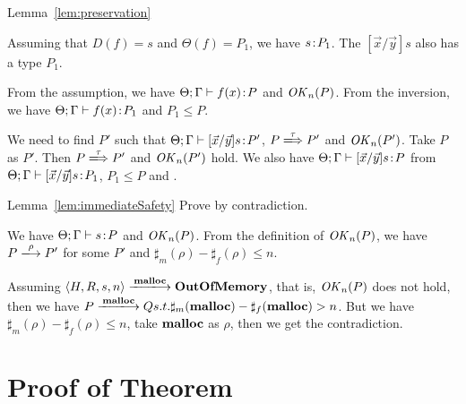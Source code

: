 \begin{pfof}{Lemma~\ref{lem:preservation}}
\begin{itemize}
  Assuming that \(D(f) = s\) and \(\Theta(f) = P_1\), we have \(s\!:\!
  P_1\). The \([\vec{x}/\vec{y}]s\) also has a type \(P_1\).

  From the assumption, we have \(\Theta;\Gamma \vdash f(x)\!:\! P\) and
  \(\mathit{OK}_n(P)\). From the inversion, we have \(\Theta;\Gamma \vdash
  f(x)\!:\! P_1\) and \(P_1 \le P\).

  We need to find \(P'\) such that \(\Theta;\Gamma \vdash [\vec{x}/\vec{y}]s\!:\!
  P'\), \(P \xLongrightarrow{\tau} P'\) and \(\mathit{OK}_n(P')\). Take \(P\) as
  \(P'\). Then \(P \xLongrightarrow{\tau} P'\) and \(\mathit{OK}_n(P')\) hold. We
  also have \(\Theta;\Gamma \vdash [\vec{x}/\vec{y}]s\!:\! P \) from
  \(\Theta;\Gamma \vdash [\vec{x}/\vec{y}]s\!:\! P_1\), \(P_1 \le P\) and
  .

\end{itemize}

\end{pfof}


\begin{pfof}{Lemma~\ref{lem:immediateSafety}}
Prove by contradiction.


We have \(\Theta;\Gamma \vdash s \!:\! P\) and \(\mathit{OK}_n(P)\). From the
definition of \(\mathit{OK}_n(P)\), we have \(P \xlongrightarrow{\rho} P'\)
for some \(P'\) and \(\sharp_m(\rho) - \sharp_f(\rho) \le n \).

Assuming \(\langle H, R, s, n\rangle \xlongrightarrow{\Malloc}
\OVERFLOW\), that is, \(\mathit{OK}_n(P)\) does not hold, then we have \(P
\xlongrightarrow{\Malloc} Q s.t. \sharp_m(\Malloc) -
\sharp_f(\Malloc) > n \).  But we have \(\sharp_m(\rho) -
\sharp_f(\rho) \le n \), take \(\mathbf{malloc}\) as \(\rho\), then we get the
contradiction.

\end{pfof}


\section{Proof of Theorem}

